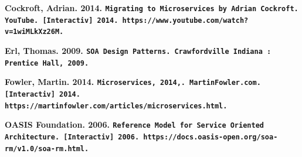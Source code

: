 \documentclass[12pt]{report}
\begin{document}
\begin{flushleft}
\textbf{
Cockroft, Adrian. 2014. \texttt{Migrating to Microservices by Adrian Cockroft. YouTube. [Interactiv] 2014. https://www.youtube.com/watch?v=1wiMLkXz26M.}}
\end{flushleft}

\begin{flushleft}
\textbf{
Erl, Thomas. 2009. \texttt{SOA Design Patterns. Crawfordville Indiana : Prentice Hall, 2009.}}
\end{flushleft}

\begin{flushleft}
\textbf{
Fowler, Martin. 2014. \texttt{Microservices, 2014,. MartinFowler.com. [Interactiv] 2014. https://martinfowler.com/articles/microservices.html.}}
\end{flushleft}

\begin{flushleft}
\textbf{
OASIS Foundation. 2006. \texttt{Reference Model for Service Oriented Architecture. [Interactiv] 2006. https://docs.oasis-open.org/soa-rm/v1.0/soa-rm.html.}}
\end{flushleft}
\end{document}
